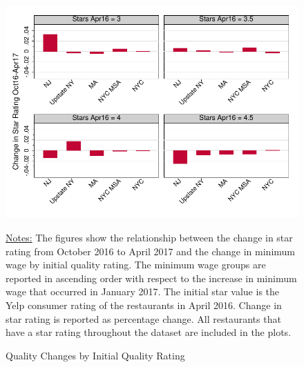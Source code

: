 \documentclass[11pt]{article}
\begin{document}
\begin{figure}[H]
\centering
\caption{Quality Changes by Initial Quality Rating}
\includegraphics[width=5in]{qualitybars.pdf}

{\footnotesize \raggedright \underline{Notes:} The figures show the relationship between the change in star rating from October 2016 to April 2017 and the change in minimum wage by initial quality rating. The minimum wage groups are reported in ascending order with respect to the increase in minimum wage that occurred in January 2017. The initial star value is the Yelp consumer rating of the restaurants in April 2016. Change in star rating is reported as percentage change. All restaurants that have a star rating throughout the dataset are included in the plots.   \par}
\end{figure}


\vspace*{\fill}


\newpage

\vspace*{\fill}
\end{document}
